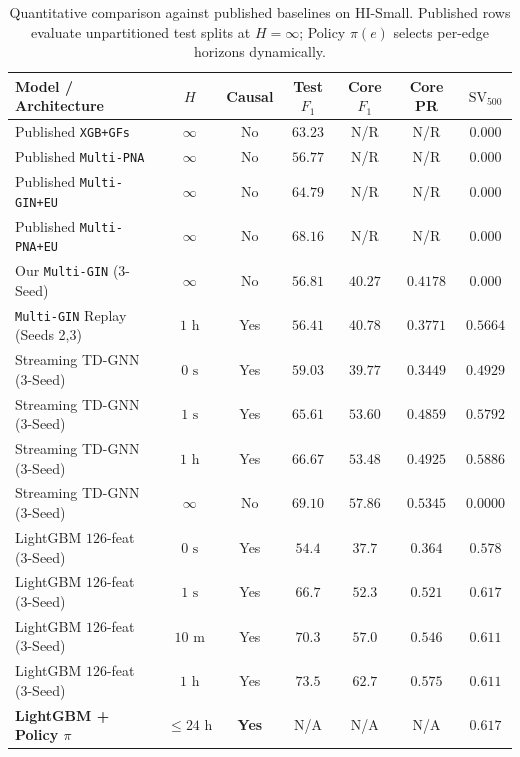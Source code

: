 \documentclass[sigconf,nonacm]{acmart}
\begin{document}
\begin{table}[t]
\centering
\caption{Quantitative comparison against published baselines on HI-Small. Published rows evaluate unpartitioned test splits at $H = \infty$; Policy $\pi(e)$ selects per-edge horizons dynamically.}
\label{tab:sota_quantitative}
\scriptsize
\setlength{\tabcolsep}{2.2pt}
\begin{tabular}{lcccccc}
\toprule
\textbf{Model / Architecture} & \textbf{$H$} & \textbf{Causal} & \textbf{Test $F_1$} & \textbf{Core $F_1$} & \textbf{Core PR} & \textbf{$\text{SV}_{500}$} \\
\midrule
Published \texttt{XGB+GFs}~\cite{egressy2024multigraph} & $\infty$ & No & $63.23$ & N/R & N/R & $0.000$ \\
Published \texttt{Multi-PNA}~\cite{altman2023ibmaml} & $\infty$ & No & $56.77$ & N/R & N/R & $0.000$ \\
Published \texttt{Multi-GIN+EU}~\cite{egressy2024multigraph} & $\infty$ & No & $64.79$ & N/R & N/R & $0.000$ \\
Published \texttt{Multi-PNA+EU}~\cite{egressy2024multigraph} & $\infty$ & No & $68.16$ & N/R & N/R & $0.000$ \\
\midrule
Our \texttt{Multi-GIN} (3-Seed) & $\infty$ & No & $56.81$ & $40.27$ & $0.4178$ & $0.000$ \\
\texttt{Multi-GIN} Replay (Seeds 2,3) & $1\text{ h}$ & Yes & $56.41$ & $40.78$ & $0.3771$ & $0.5664$ \\
\midrule
Streaming TD-GNN (3-Seed) & $0\text{ s}$ & Yes & $59.03$ & $39.77$ & $0.3449$ & $0.4929$ \\
Streaming TD-GNN (3-Seed) & $1\text{ s}$ & Yes & $65.61$ & $53.60$ & $0.4859$ & $0.5792$ \\
Streaming TD-GNN (3-Seed) & $1\text{ h}$ & Yes & $66.67$ & $53.48$ & $0.4925$ & $0.5886$ \\
Streaming TD-GNN (3-Seed) & $\infty$ & No & $69.10$ & $57.86$ & $0.5345$ & $0.0000$ \\
\midrule
LightGBM $126$-feat (3-Seed) & $0\text{ s}$ & Yes & $54.4$ & $37.7$ & $0.364$ & $0.578$ \\
LightGBM $126$-feat (3-Seed) & $1\text{ s}$ & Yes & $66.7$ & $52.3$ & $0.521$ & $0.617$ \\
LightGBM $126$-feat (3-Seed) & $10\text{ m}$ & Yes & $70.3$ & $57.0$ & $0.546$ & $0.611$ \\
LightGBM $126$-feat (3-Seed) & $1\text{ h}$ & Yes & $\mathbf{73.5}$ & $\mathbf{62.7}$ & $\mathbf{0.575}$ & $0.611$ \\
\textbf{LightGBM + Policy $\pi$} & $\le 24\text{ h}$ & \textbf{Yes} & N/A & N/A & N/A & $\mathbf{0.617}$ \\
\bottomrule
\end{tabular}
\end{table}
\end{document}

